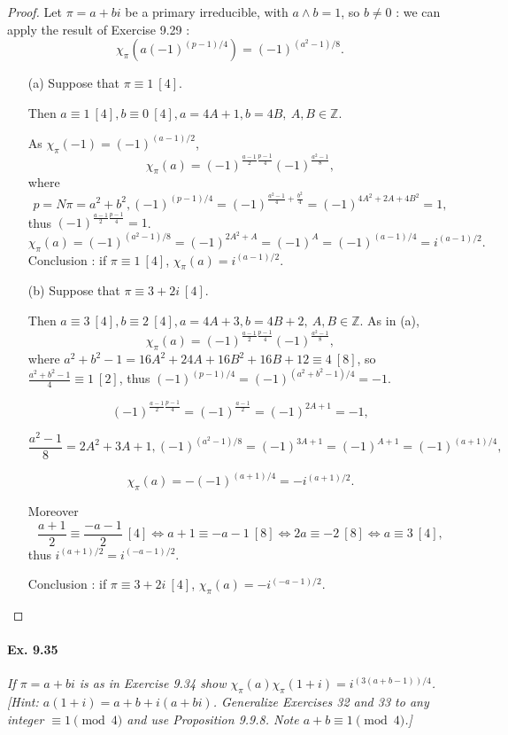 \documentclass[11pt,a4paper]{article}
\begin{document}
\begin{proof}
Let $\pi = a+bi$ be a primary irreducible, with $a\wedge b=1$, so $b \neq 0$ : we can apply the result of Exercise 9.29 :
$$\chi_\pi(a(-1)^{(p-1)/4}) = (-1)^{(a^2-1)/8}.$$
\begin{enumerate}
\item[(a)] Suppose that  $\pi \equiv 1 \ [4]$. 

Then $a\equiv 1\ [4], b\equiv 0 \ [4], a = 4A+1,b=4B,\ A,B \in \mathbb{Z}$.

As $\chi_\pi(-1) = (-1)^{(a-1)/2}$, 
$$\chi_\pi(a) = (-1)^{\frac{a-1}{2} \frac{p-1}{4}}(-1)^{\frac{a^2-1}{8}},$$
where 
$$ p = N \pi = a^2+b^2, (-1)^{(p-1)/4} = (-1)^{\frac{a^2-1}{4}+\frac{b^2}{4}} = (-1)^{4A^2+2A+4B^2}=1,$$
thus $(-1)^{\frac{a-1}{2} \frac{p-1}{4}}=1$.
$$\chi_\pi(a) = (-1)^{(a^2-1)/8} = (-1)^{2A^2+A} = (-1)^A = (-1)^{(a-1)/4} = i^{(a-1)/2}.$$
Conclusion : if $\pi \equiv 1 \ [4]$, $\chi_\pi(a) =  i^{(a-1)/2}$.
\item[(b)] Suppose that $\pi \equiv 3 + 2i\ [4]$.

Then $a\equiv 3 \ [4], b \equiv 2\ [4],a = 4A+3,b=4B+2,\ A,B\in\mathbb{Z}$. As in (a),
$$\chi_\pi(a) = (-1)^{\frac{a-1}{2} \frac{p-1}{4}}(-1)^{\frac{a^2-1}{8}},$$
where $a^2+b^2-1 = 16 A^2+24A+16B^2+16B+12 \equiv 4 \ [8]$, so $\frac{a^2+b^2-1}{4} \equiv 1 \ [2]$, thus $(-1)^{(p-1)/4} = (-1)^{(a^2+b^2-1)/4} = -1$.

$$ (-1)^{\frac{a-1}{2} \frac{p-1}{4}} = (-1)^{\frac{a-1}{2}} = (-1)^{2A+1} = -1,$$

$$\frac{a^2-1}{8} = 2A^2+3A+1, (-1)^{(a^2-1)/8} = (-1)^{3A+1} = (-1)^{A+1}=(-1)^{(a+1)/4},$$

$$\chi_\pi(a)= -(-1)^{(a+1)/4} = -i^{(a+1)/2}.$$

Moreover $$\frac{a+1}{2} \equiv \frac{-a-1}{2} \ [4] \iff a+1 \equiv -a-1\ [8] \iff 2a\equiv -2 \ [8] \iff a\equiv 3 \ [4],$$ thus $i^{(a+1)/2} = i ^{(-a-1)/2}$.

Conclusion : if $\pi \equiv 3+2i \ [4]$, $\chi_\pi(a) = - i^{(-a-1)/2}$.

\end{enumerate}
\end{proof}

\paragraph{Ex. 9.35}

{\it If $\pi = a+bi$ is as in Exercise 9.34 show $\chi_\pi(a)\chi_\pi(1+i) = i ^{(3(a+b-1))/4}$. [Hint: $a(1+i) = a+b +i(a+bi)$. Generalize Exercises 32 and 33 to any integer $\equiv 1 \pmod 4$ and use Proposition 9.9.8. Note $a+b \equiv 1 \pmod 4$.]
}
\end{document}
